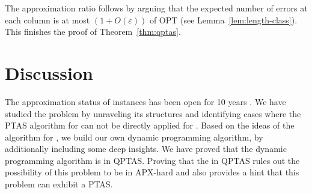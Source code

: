The approximation ratio follows by arguing that the expected number of errors at each column is at most $(1+O(\varepsilon))$ of OPT
(see Lemma~\ref{lem:length-class}).
This finishes the proof of Theorem~\ref{thm:qptas}.

\vspace{5cm}
\section{Discussion}
The approximation status of \GMEC instances has been open for 10 years \citep{Cilibrasi2007}. 
We have studied the problem by unraveling its structures and identifying cases where the PTAS algorithm for \BMEC can not be directly applied for \GMEC.
Based on the ideas of the algorithm for \BMEC, we build our own dynamic programming algorithm, by additionally including some deep insights. 
We have proved that the dynamic programming algorithm is in QPTAS.
Proving that the \GMEC in QPTAS rules out the possibility of this problem to be in APX-hard and also provides a hint that this problem can exhibit a PTAS.


\bigskip

\begin{center}\end{center}


